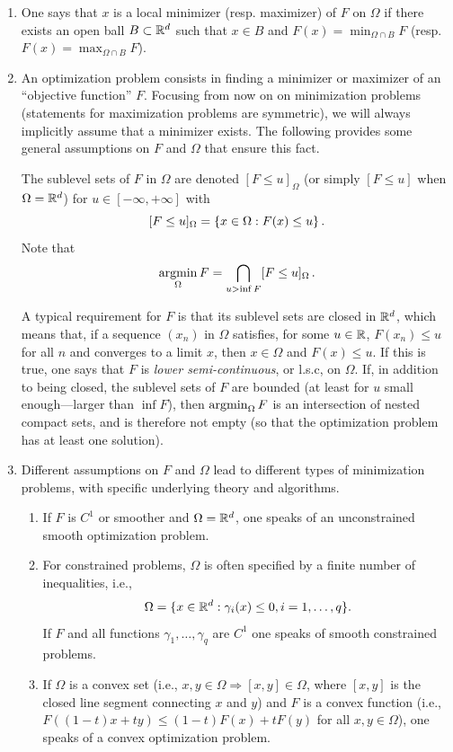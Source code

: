 \begin{enumerate}[label={\bf \arabic*.}]
\item One says that $x$ is a local minimizer (resp. maximizer) of $F$ on $\Omega$ if there exists an open ball $B\subset {\mathbb{R}}^d$ such that $x\in B$ and $F(x) = \min_{\Omega \cap B} F$ (resp. $F(x) = \max_{\Omega \cap B} F$). 

\item An optimization problem consists in finding a minimizer or maximizer of an ``objective function'' $F$.
Focusing from now on on minimization problems (statements for maximization problems are symmetric), we will always implicitly assume that a minimizer exists. The following provides some general assumptions on $F$ and $\Omega$ that ensure this fact. 

The sublevel sets of $F$ in $\Omega$  are denoted $[F\leq u]_\Omega$ (or simply $[F\leq u]$ when $\Omega = {\mathbb{R}}^d$) for $u\in [-\infty, + \infty]$ with
\[
[F\leq u]_\Omega = \left\{ x\in\Omega: F(x) \leq u \right\}.
\] 
Note that 
\[
\operatorname*{argmin}_\Omega F = \bigcap_{u>\inf F} [F\leq u]_\Omega\,.
\]

A typical requirement for $F$ is that its sublevel sets are  closed in ${\mathbb{R}}^d$,  which means that, if a sequence $(x_n)$ in $\Omega$ satisfies, for some $u\in {\mathbb{R}}$, $F(x_n) \leq u$ for all $n$ and converges to a limit $x$, then $x\in \Omega$ and $F(x) \leq u$. 
If this is true, one says that $F$ is {\em lower semi-continuous}, or l.s.c, on $\Omega$. If, in addition to being closed, the sublevel sets of $F$ are bounded (at least for $u$ small enough---larger than $\inf F$), then $\operatorname*{argmin}_\Omega F$ is an intersection of nested compact sets, and is therefore not empty (so that  the optimization problem has at least one solution).  

\item Different assumptions on $F$ and $\Omega$ lead to different types of minimization problems, with specific underlying theory and algorithms.
\begin{enumerate}[label= \arabic*.,wide=10pt]
\item If $F$ is $C^1$ or smoother and $\Omega = {\mathbb{R}}^d$, one speaks of an unconstrained smooth optimization problem. 
\item For constrained problems, $\Omega$ is often specified by a finite number of inequalities, i.e., 
\[
\Omega = \{x\in {\mathbb{R}}^d: \gamma_i(x) \leq 0, i=1, \ldots, q\}.
\]
If $F$ and all functions $\gamma_1, \ldots, \gamma_q$ are $C^1$ one speaks of smooth constrained problems. 
\item If $\Omega$ is a convex set (i.e., $x, y\in \Omega \Rightarrow [x,y]\in \Omega$, where $[x,y]$ is the closed line segment connecting $x$ and $y$) and $F$ is a convex function (i.e., $F((1-t)x + ty) \leq (1-t) F(x) + t F(y)$ for all $x,y\in \Omega$), one speaks of a convex optimization problem. 


\end{enumerate}
\end{enumerate}
